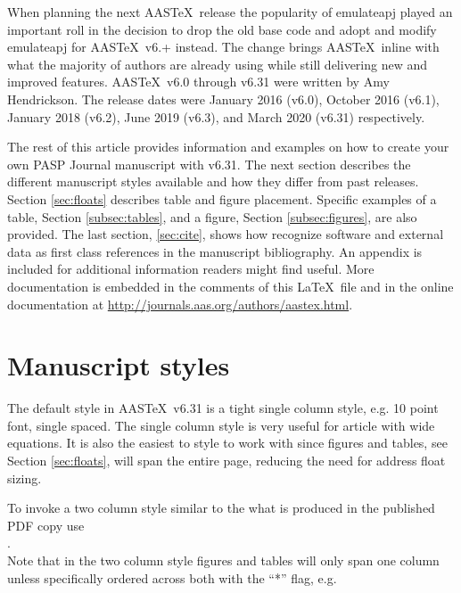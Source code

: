 \documentclass[linenumbers]{aastex631}
\newcommand\aastex{AAS\TeX}
\newcommand\latex{La\TeX}
\begin{document}
When planning the next \aastex\ release the popularity of emulateapj played
an important roll in the decision to drop the old base code and adopt and
modify emulateapj for \aastex\ v6.+ instead.  The change brings \aastex\
inline with what the majority of authors are already using while still
delivering new and improved features.  \aastex\ v6.0 through v6.31 were
written by Amy Hendrickson. The release dates were January 2016 (v6.0),
October 2016 (v6.1), January 2018 (v6.2), June 2019 (v6.3), and March 2020
(v6.31) respectively.

The rest of this article provides information and examples on how to create
your own PASP Journal manuscript with v6.31. The next section describes
the different manuscript styles available and how they differ from past
releases.  Section \ref{sec:floats} describes table and figure placement. 
Specific examples of a table, Section \ref{subsec:tables}, and a figure,
Section \ref{subsec:figures}, are also provided.  The last section,
\ref{sec:cite}, shows how recognize software and external data as first
class references in the manuscript bibliography.  An appendix is included
for additional information readers might find useful.
More documentation is embedded in the comments of this \latex\ file and in the online documentation at
\url{http://journals.aas.org/authors/aastex.html}.

\section{Manuscript styles} \label{sec:style}

The default style in \aastex\ v6.31 is a tight single column style, e.g. 10
point font, single spaced.  The single column style is very useful for
article with wide equations. It is also the easiest to style to work with
since figures and tables, see Section \ref{sec:floats}, will span the
entire page, reducing the need for address float sizing.

To invoke a two column style similar to the what is produced in
the published PDF copy use \\

. \\

\noindent Note that in the two column style figures and tables will only
span one column unless specifically ordered across both with the ``*'' flag,
e.g. \\
\end{document}
